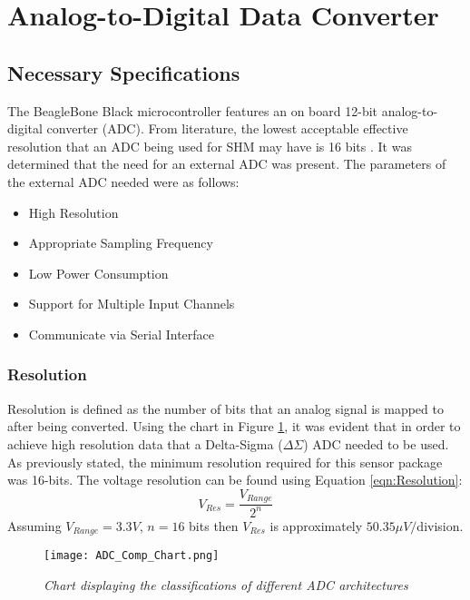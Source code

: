 \section{Analog-to-Digital Data Converter}
\subsection{Necessary Specifications}
\label{sec:ADC_Parameters}
\indent The BeagleBone Black microcontroller features an on board 12-bit analog-to-digital converter (ADC). From literature, the lowest acceptable effective resolution that an ADC being used for SHM may have is 16 bits\cite{Cunha_Caetano} \cite{JangSWMWSS}. It was determined that the need for an external ADC was present. The parameters of the external ADC needed were as follows:
\begin{itemize}
\item High Resolution
\item Appropriate Sampling Frequency
\item Low Power Consumption 
\item Support for Multiple Input Channels
\item Communicate via Serial Interface
\end{itemize}
\subsubsection{Resolution}
\label{sec:adc_res}
\indent Resolution is defined as the number of bits that an analog signal is mapped to after being converted\cite{MusaJouaneh:2013}. Using the chart in Figure \ref{fig:ADC_Comp_Chart}, it was evident that in order to achieve high resolution data that a Delta-Sigma ($\Delta\Sigma$) ADC needed to be used.\\
\indent As previously stated, the minimum resolution required for this sensor package was 16-bits. The voltage resolution can be found using Equation \ref{eqn:Resolution}:
\begin{equation}
\label{eqn:Resolution}
V_{Res} = \frac{V_{Range}}{2^{n}}
\end{equation}
Assuming $V_{Range}=3.3V$, $n=16$ bits then $V_{Res}$ is approximately $50.35\mu V/$division. 

\begin{figure}[H]
\centering
\texttt{[image: ADC\_Comp\_Chart.png]}
\caption{\textit{Chart displaying the classifications of different ADC architectures \cite{WaltKester:2005}}}
\label{fig:ADC_Comp_Chart}
\end{figure}
%
